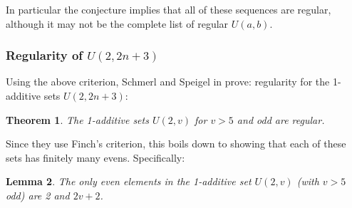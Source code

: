 \documentclass{article}
\newtheorem{theorem}{Theorem}[section]
\newtheorem{lemma}[theorem]{Lemma}
\theoremstyle{definition}
\theoremstyle{remark}
\numberwithin{equation}{section}
\begin{document}
In particular the conjecture implies that all of these sequences are
regular, although it may not be the complete list of regular $U(a,b)$.

\subsubsection{Regularity of $U(2,2n+3)$}

Using the above criterion, Schmerl and Speigel in
\cite{schmerl:jct1994} prove: regularity for the 1-additive sets
$U(2, 2n+3)$:

\begin{theorem}
The 1-additive sets $U(2,v)$ for $v > 5$ and odd are regular.
\end{theorem}

Since they use Finch's criterion, this boils down to showing that each
of these sets has finitely many evens.  Specifically: 

\begin{lemma}The only even elements in the 1-additive set $U(2,v)$
  (with $v > 5$ odd) are 2 and $2v+2$.
\end{lemma}
\end{document}
